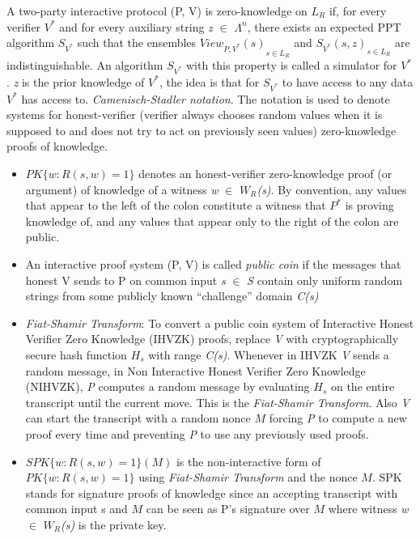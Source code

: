 \documentclass[a4paper]{article}
\newcommand{\quotes}[1]{``#1''}
\begin{document}
A two-party interactive protocol (P, V) is zero-knowledge on \textit{$L_R$} if, for every verifier ${V^{*}}$ and for every auxiliary string \textit{z} $\in$ \(\Lambda^n\), there exists an expected PPT algorithm $S_{V^{*}}$ such that the ensembles ${ View_{P,V^{*}}(s)}_{s \in L_R }$ and ${S_{V^{*}}(s,z)}_{s \in L_R }$ are indistinguishable. An algorithm $S_{V^{*}}$ with this property is called a simulator for ${V^{*}}$. \textit{z} is the prior knowledge of ${V^{*}}$, the idea is that for $S_{V^{*}}$ to have access to any data ${V^{*}}$ has access to. 
\newline
\textit{ Camenisch-Stadler notation}. The notation is used to denote systems for honest-verifier (verifier always chooses random values when it is supposed to and does not try to act on previously seen values) zero-knowledge proofs of knowledge.
\begin{itemize}
  \item $PK\{w : R(s,w) = 1\}$ denotes an honest-verifier zero-knowledge proof (or argument) of knowledge of a witness \textit{w} $\in$ \textit{$W_R$(s)}. By convention, any values that appear to the left of the colon constitute a witness that ${P^{*}}$ is proving knowledge of, and any values that appear only to the right of the colon are public.
  \item An interactive proof system (P, V) is called \emph{public coin} if the messages that honest V sends to P on common input \textit{s} $\in$ \textit{S} contain only uniform random strings from some publicly known \quotes{challenge} domain \textit{C(s)} 
  \item \emph{Fiat-Shamir Transform}: To convert a public coin system of Interactive Honest Verifier Zero Knowledge (IHVZK) proofs, replace \textit{V} with cryptographically secure hash function $H_s$ with range \textit{C(s)}. Whenever in IHVZK \textit{V} sends a random message, in Non Interactive Honest Verifier Zero Knowledge (NIHVZK), \textit{P} computes a random message by evaluating $H_s$ on the entire transcript until the current move. This is the \emph{Fiat-Shamir Transform}. Also \textit{V} can start the transcript with a random nonce $M$ forcing \textit{P} to compute a new proof every time and preventing \textit{P} to use any previously used proofs.
  \item $SPK\{w : R(s,w) = 1\}(M)$ is the non-interactive form of $PK\{w : R(s,w) = 1\}$ using \emph{Fiat-Shamir Transform} and the nonce $M$. SPK stands for signature proofs of knowledge since an accepting transcript with common input s and $M$ can be seen as P's signature over $M$ where witness \textit{w} $\in$ \textit{$W_R$(s)} is the private key. 
\end{itemize}
\end{document}
